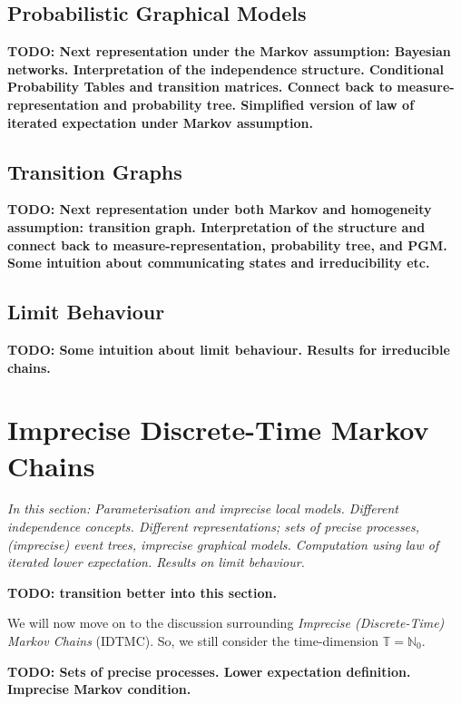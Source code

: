 \documentclass[graybox]{svmult}
\newcommand{\nats}{\mathbb{N}}
\newcommand{\natswith}{\nats_{0}}
\newcommand{\timedim}{\mathbb{T}}
\begin{document}
\subsection{Probabilistic Graphical Models}

{\bf TODO: Next representation under the Markov assumption: Bayesian networks. Interpretation of the independence structure. Conditional Probability Tables and transition matrices. Connect back to measure-representation and probability tree. Simplified version of law of iterated expectation under Markov assumption. }

\subsection{Transition Graphs}

{\bf TODO: Next representation under both Markov and homogeneity assumption: transition graph. Interpretation of the structure and connect back to measure-representation, probability tree, and PGM. Some intuition about communicating states and irreducibility etc. }

\subsection{Limit Behaviour}

{\bf TODO: Some intuition about limit behaviour. Results for irreducible chains. }

\section{Imprecise Discrete-Time Markov Chains}

\emph{In this section: Parameterisation and imprecise local models. Different independence concepts. Different representations; sets of precise processes, (imprecise) event trees, imprecise graphical models. Computation using law of iterated lower expectation. Results on limit behaviour.}

{\bf TODO: transition better into this section. }

We will now move on to the discussion surrounding \emph{Imprecise (Discrete-Time) Markov Chains} (IDTMC). So, we still consider the time-dimension $\timedim=\natswith$. 

{\bf TODO: Sets of precise processes. Lower expectation definition. Imprecise Markov condition.}
\end{document}
